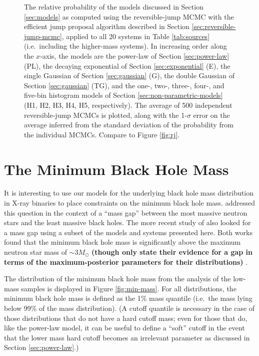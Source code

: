 \documentclass[preprint]{aastex}
\newcommand{\Msun}{M_\odot}
\newcommand{\changed}[1]{{\bf #1 }}
\begin{document}
\begin{figure}
  \begin{center}
  \end{center}
  \caption{\label{fig:high-rj-evidence} The relative probability of
    the models discussed in Section \ref{sec:models} as computed using
    the reversible-jump MCMC with the efficient jump proposal
    algorithm described in Section \ref{sec:reversible-jump-mcmc},
    applied to all 20 systems in Table \ref{tab:sources} (i.e.\
    including the higher-mass systems).  In increasing order along the
    $x$-axis, the models are the power-law of Section
    \ref{sec:power-law} (PL), the decaying exponential of Section
    \ref{sec:exponential} (E), the single Gaussian of Section
    \ref{sec:gaussian} (G), the double Gaussian of Section
    \ref{sec:gaussian} (TG), and the one-, two-, three-, four-, and
    five-bin histogram models of Section
    \ref{sec:non-parametric-models} (H1, H2, H3, H4, H5,
    respectively).  The average of 500 independent reversible-jump
    MCMCs is plotted, along with the 1-$\sigma$ error on the average
    inferred from the standard deviation of the probability from the
    individual MCMCs.  Compare to Figure \ref{fig:rj}.}
\end{figure}


\section{The Minimum Black Hole Mass}
\label{sec:minimum-mass}

It is interesting to use our models for the underlying black hole mass
distribution in X-ray binaries to place constraints on the minimum
black hole mass.  \citet{Bailyn1998} addressed this question in the
context of a ``mass gap'' between the most massive neutron stars and
the least massive black holes.  The more recent study of
\citet{Ozel2010} also looked for a mass gap using a subset of the
models and systems presented here.  Both works found that the minimum
black hole mass is significantly above the maximum neutron star mass
\citep{Kalogera1996} of $\sim 3 \Msun$ \changed{(though
  \citet{Ozel2010} only state their evidence for a gap in terms of the
  maximum-posterior parameters for their distributions)}.

The distribution of the minimum black hole mass from the analysis of
the low-mass samples is displayed in Figure \ref{fig:min-mass}.  For
all distributions, the minimum black hole mass is defined as the 1\%
mass quantile (i.e.\ the mass lying below 99\% of the mass
distribution).  (A cutoff quantile is necessary in the case of those
distributions that do not have a hard cutoff mass; even for those that
do, like the power-law model, it can be useful to define a ``soft''
cutoff in the event that the lower mass hard cutoff becomes an
irrelevant parameter as discussed in Section \ref{sec:power-law}.)
\end{document}
